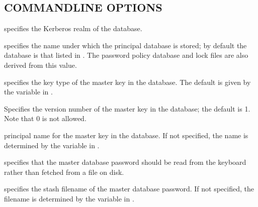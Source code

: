 \documentclass[letterpaper,10pt,english]{sphinxmanual}
\begin{document}
\subsection{COMMAND\sphinxhyphen{}LINE OPTIONS}
\label{\detokenize{admin/admin_commands/kdb5_util:command-line-options}}\label{\detokenize{admin/admin_commands/kdb5_util:kdb5-util-options}}\begin{description}
\sphinxAtStartPar
specifies the Kerberos realm of the database.

\sphinxAtStartPar
specifies the name under which the principal database is stored;
by default the database is that listed in {\hyperref[\detokenize{admin/conf_files/kdc_conf:kdc-conf-5}]{}}.  The
password policy database and lock files are also derived from this
value.

\sphinxAtStartPar
specifies the key type of the master key in the database.  The
default is given by the  variable in
{\hyperref[\detokenize{admin/conf_files/kdc_conf:kdc-conf-5}]{}}.

\sphinxAtStartPar
Specifies the version number of the master key in the database;
the default is 1.  Note that 0 is not allowed.

\sphinxAtStartPar
principal name for the master key in the database.  If not
specified, the name is determined by the 
variable in {\hyperref[\detokenize{admin/conf_files/kdc_conf:kdc-conf-5}]{}}.

\sphinxAtStartPar
specifies that the master database password should be read from
the keyboard rather than fetched from a file on disk.

\sphinxAtStartPar
specifies the stash filename of the master database password.  If
not specified, the filename is determined by the
 variable in {\hyperref[\detokenize{admin/conf_files/kdc_conf:kdc-conf-5}]{}}.


\end{description}
\end{document}
